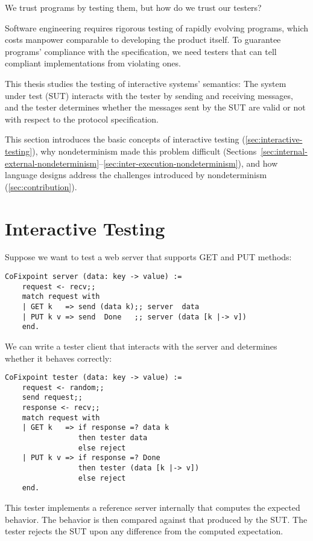 We trust programs by testing them, but how do we trust our testers?

Software engineering requires rigorous testing of rapidly evolving programs,
which costs manpower comparable to developing the product itself.  To guarantee
programs' compliance with the specification, we need testers that can tell
compliant implementations from violating ones.

This thesis studies the testing of interactive systems' semantics: The system
under test (SUT) interacts with the tester by sending and receiving messages,
and the tester determines whether the messages sent by the SUT are valid or not
with respect to the protocol specification.

This section introduces the basic concepts of interactive testing
(\autoref{sec:interactive-testing}), why nondeterminism made this problem
difficult
(Sections~\ref{sec:internal-external-nondeterminism}--\ref{sec:inter-execution-nondeterminism}),
and how language designs address the challenges introduced by nondeterminism
(\autoref{sec:contribution}).

\section{Interactive Testing}
\label{sec:interactive-testing}
Suppose we want to test a web server that supports GET and PUT methods:
\begin{lstlisting}[style=customcoq]
  CoFixpoint server (data: key -> value) :=
    request <- recv;;
    match request with
    | GET k   => send (data k);; server  data
    | PUT k v => send  Done   ;; server (data [k |-> v])
    end.
\end{lstlisting}
We can write a tester client that interacts with the server and determines
whether it behaves correctly:
\begin{lstlisting}[style=customcoq]
  CoFixpoint tester (data: key -> value) :=
    request <- random;;
    send request;;
    response <- recv;;
    match request with
    | GET k   => if response =? data k
                 then tester data
                 else reject
    | PUT k v => if response =? Done
                 then tester (data [k |-> v])
                 else reject
    end.
\end{lstlisting}
This tester implements a reference server internally that computes the expected
behavior.  The behavior is then compared against that produced by the SUT.  The
tester rejects the SUT upon any difference from the computed expectation.

